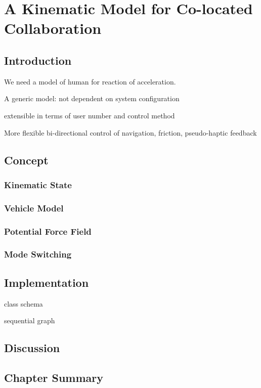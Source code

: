 \chapter{A Kinematic Model for Co-located Collaboration}
\label{chapter:kinematic_model}
\minitoc

\section{Introduction}
We need a model of human for reaction of acceleration.

A generic model: not dependent on system configuration
 
extensible in terms of user number and control method

More flexible bi-directional control of navigation, friction, pseudo-haptic feedback

\section{Concept}
\subsection{Kinematic State}
\subsection{Vehicle Model}
\subsection{Potential Force Field}
\subsection{Mode Switching}

\section{Implementation}

class schema

sequential graph

\section{Discussion}

\section{Chapter Summary}

